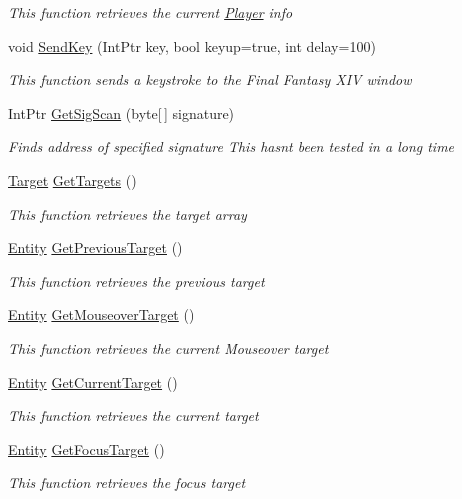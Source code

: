 \begin{DoxyCompactItemize}
\begin{DoxyCompactList}\small\item\em This function retrieves the current \hyperlink{classffxivlib_1_1_player}{Player} info \end{DoxyCompactList}\item 
void \hyperlink{classffxivlib_1_1_f_f_x_i_v_l_i_b_ac4d88c5b015e78af8455be0bef6f3aca}{Send\-Key} (Int\-Ptr key, bool keyup=true, int delay=100)
\begin{DoxyCompactList}\small\item\em This function sends a keystroke to the Final Fantasy X\-I\-V window \end{DoxyCompactList}\item 
Int\-Ptr \hyperlink{classffxivlib_1_1_f_f_x_i_v_l_i_b_a9a29f9a5a3872f96ab9b3a1dd48c3256}{Get\-Sig\-Scan} (byte\mbox{[}$\,$\mbox{]} signature)
\begin{DoxyCompactList}\small\item\em Finds address of specified signature This hasnt been tested in a long time \end{DoxyCompactList}\item 
\hyperlink{classffxivlib_1_1_target}{Target} \hyperlink{classffxivlib_1_1_f_f_x_i_v_l_i_b_ab9c4560506d6cdb37c138b25da38f7f7}{Get\-Targets} ()
\begin{DoxyCompactList}\small\item\em This function retrieves the target array \end{DoxyCompactList}\item 
\hyperlink{classffxivlib_1_1_entity}{Entity} \hyperlink{classffxivlib_1_1_f_f_x_i_v_l_i_b_a9f332cf47bdc90a63d62131f51ad69bb}{Get\-Previous\-Target} ()
\begin{DoxyCompactList}\small\item\em This function retrieves the previous target \end{DoxyCompactList}\item 
\hyperlink{classffxivlib_1_1_entity}{Entity} \hyperlink{classffxivlib_1_1_f_f_x_i_v_l_i_b_a53f76a0a73f50e6e4e76b61780c4915a}{Get\-Mouseover\-Target} ()
\begin{DoxyCompactList}\small\item\em This function retrieves the current Mouseover target \end{DoxyCompactList}\item 
\hyperlink{classffxivlib_1_1_entity}{Entity} \hyperlink{classffxivlib_1_1_f_f_x_i_v_l_i_b_abb0899feb3c378445a01d70d59866f43}{Get\-Current\-Target} ()
\begin{DoxyCompactList}\small\item\em This function retrieves the current target \end{DoxyCompactList}\item 
\hyperlink{classffxivlib_1_1_entity}{Entity} \hyperlink{classffxivlib_1_1_f_f_x_i_v_l_i_b_a61b106aad35dc8e3d5062f7dcd03dd0a}{Get\-Focus\-Target} ()
\begin{DoxyCompactList}\small\item\em This function retrieves the focus target \end{DoxyCompactList}\end{DoxyCompactItemize}


